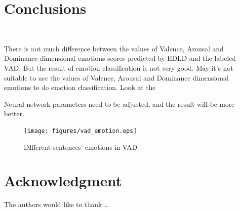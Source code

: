 
\section{Conclusions} \label{sec-conclusions}
\
	
	There is not much difference between 
	the values of Valence, Arousal and Dominance 
	dimensional emotions scores predicted by EDLD
	and the labeled VAD.
	But the result of
	emotion classification is
	not very good.
	May it's not suitable to
	use the values of Valence, Arousal and Dominance 
	dimensional emotions to
	do emotion classification.
	Look at the 
	
	
	Neural network parameters need to be adjusted,
	and the result will be more better.

\begin{figure}[htbp]
	\centering
	\texttt{[image: figures/vad\_emotion.eps]}
	\caption{DIfferent sentences' emotions in VAD}\label{fig:1}
\end{figure}

\section*{Acknowledgment}

\lipsum[1]


The authors would like to thank \ldots

